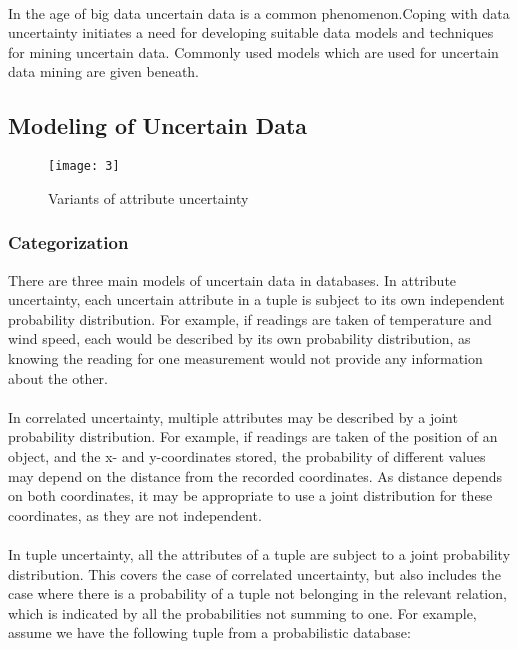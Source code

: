 \documentclass[a4paper,12pt]{book}
\begin{document}
\paragraph{}
In the age of big data uncertain data is a common phenomenon.Coping with data uncertainty initiates a need for developing suitable data models and techniques for mining uncertain data. Commonly used models which are used for uncertain data mining are given beneath.
\subsection{Modeling of Uncertain Data}

\begin{figure}[h!]
\texttt{[image: 3]}
\caption{Variants of attribute uncertainty}
\label{fig:Uncertainty modeling}
\end{figure}
\subsubsection{Categorization}
There are three main models of uncertain data in databases. In attribute uncertainty, each uncertain attribute in a tuple is subject to its own independent probability distribution. For example, if readings are taken of temperature and wind speed, each would be described by its own probability distribution, as knowing the reading for one measurement would not provide any information about the other.
\paragraph{}
In correlated uncertainty, multiple attributes may be described by a joint probability distribution. For example, if readings are taken of the position of an object, and the x- and y-coordinates stored, the probability of different values may depend on the distance from the recorded coordinates. As distance depends on both coordinates, it may be appropriate to use a joint distribution for these coordinates, as they are not independent.
\paragraph{}
In tuple uncertainty, all the attributes of a tuple are subject to a joint probability distribution. This covers the case of correlated uncertainty, but also includes the case where there is a probability of a tuple not belonging in the relevant relation, which is indicated by all the probabilities not summing to one. For example, assume we have the following tuple from a probabilistic database:
\end{document}
